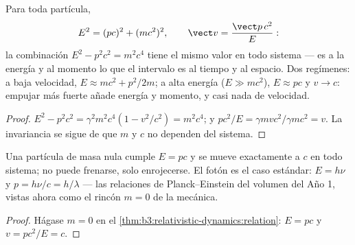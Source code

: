 \begin{theorem}\label{thm:b3:relativistic-dynamics:relation}
Para toda partícula,
\[
E^2 = (pc)^2 + (mc^2)^2 ,
\qquad
\vect v = \frac{\vect p\,c^2}{E} :
\]
la combinación $E^2 - p^2c^2 = m^2c^4$ tiene el mismo valor en todo sistema
--- es a la energía y al momento lo que el intervalo es al tiempo y al
espacio. Dos regímenes: a baja velocidad, $E \approx mc^2 + p^2/2m$; a alta
energía ($E \gg mc^2$), $E \approx pc$ y $v \to c$: empujar más fuerte añade
energía y momento, y casi nada de velocidad.
\end{theorem}

\begin{proof}
$E^2 - p^2c^2 = \gamma^2m^2c^4(1 - v^2/c^2) = m^2c^4$; y $pc^2/E =
\gamma mvc^2/\gamma mc^2 = v$. La invariancia se sigue de que $m$
y $c$ no dependen del sistema.
\end{proof}

\begin{proposition}\label{prop:b3:relativistic-dynamics:massless}
Una partícula de masa nula cumple $E = pc$ y se mueve exactamente a $c$ en
todo sistema; no puede frenarse, solo enrojecerse. El fotón es el caso
estándar: $E = h\nu$ y $p = h\nu/c = h/\lambda$ --- las relaciones de
Planck--Einstein del volumen del Año 1, vistas ahora como el rincón
$m = 0$ de la mecánica.
\end{proposition}

\begin{proof}
Hágase $m = 0$ en el \cref{thm:b3:relativistic-dynamics:relation}: $E = pc$
y $v = pc^2/E = c$.
\end{proof}

